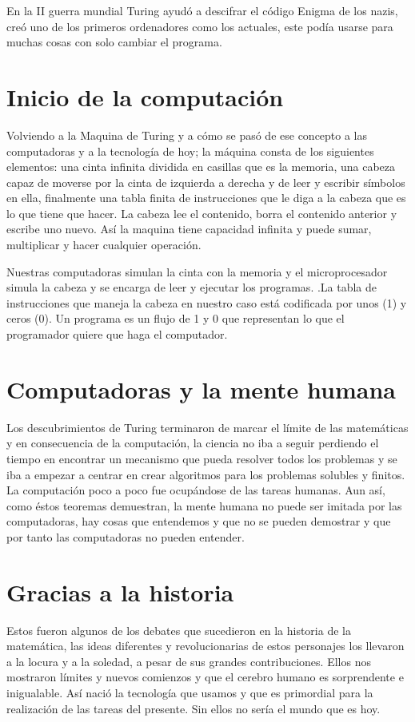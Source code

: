 ﻿\documentclass[journal,10pt,spanish]{IEEEtran}
\begin{document}
En la II guerra mundial Turing ayudó a descifrar el código Enigma de los nazis, creó uno de los primeros ordenadores como los actuales, este podía usarse para muchas cosas con solo cambiar el programa. 

\section{ Inicio de la computación}

Volviendo a la Maquina de Turing y a cómo se pasó de ese concepto a las computadoras y a la tecnología de hoy;  la máquina consta de los siguientes elementos: una cinta infinita dividida en casillas que es la memoria, una cabeza capaz de moverse por la cinta de izquierda a derecha y de leer y escribir símbolos en ella, finalmente una tabla finita de instrucciones que le diga a la cabeza que es lo que tiene que hacer. La cabeza lee el contenido, borra el contenido anterior y escribe uno nuevo. Así la maquina tiene capacidad infinita y puede sumar, multiplicar y hacer cualquier operación. 


Nuestras computadoras simulan la cinta con la memoria y el microprocesador simula la cabeza y se encarga de leer y ejecutar los programas. \cite{sitio7}.La tabla de instrucciones que maneja la cabeza en nuestro caso está codificada por unos (1) y ceros (0). Un programa es un flujo de 1 y 0 que representan lo que el programador quiere que haga el computador.

\section{Computadoras y la mente humana}

Los descubrimientos de Turing terminaron de marcar el límite de las matemáticas y en consecuencia de la computación, la ciencia no iba a seguir perdiendo el tiempo en encontrar un mecanismo que pueda resolver todos los problemas y se iba a empezar a centrar en crear algoritmos para los problemas solubles y finitos. La computación poco a poco fue ocupándose de las tareas humanas. Aun así, como éstos teoremas demuestran, la mente humana no puede ser imitada por las computadoras, hay cosas que entendemos  y que no se pueden demostrar y  que por tanto las computadoras no pueden entender.

\section{Gracias a la historia}

Estos fueron algunos de los debates que sucedieron en la historia de la matemática, las ideas diferentes y revolucionarias de estos personajes  los llevaron a la locura y a la soledad, a pesar de sus grandes contribuciones. Ellos nos mostraron límites y nuevos comienzos y que el cerebro humano es sorprendente e inigualable. Así nació la tecnología que usamos y que es primordial para la realización de las tareas del presente. Sin ellos no sería el mundo que es hoy.



\end{document}
